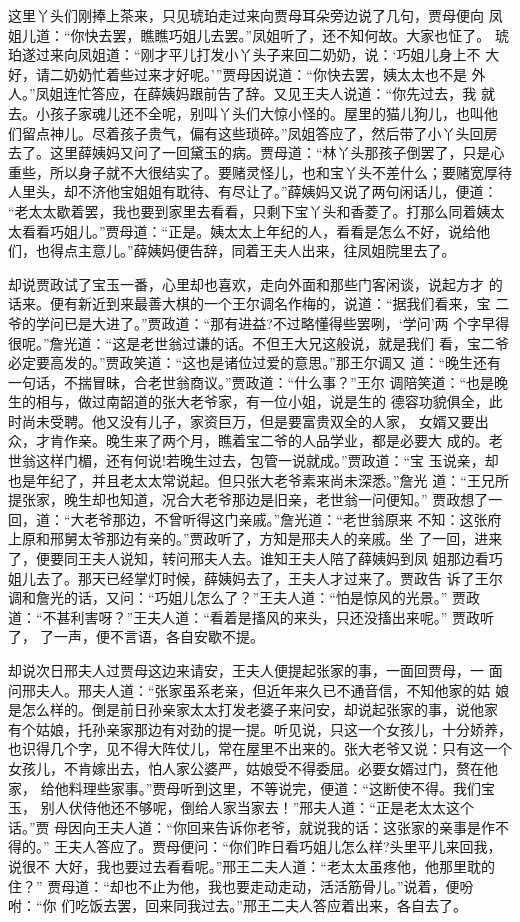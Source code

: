 这里丫头们刚捧上茶来，只见琥珀走过来向贾母耳朵旁边说了几句，贾母便向
凤姐儿道：“你快去罢，瞧瞧巧姐儿去罢。”凤姐听了，还不知何故。大家也怔了。
琥珀遂过来向凤姐道：“刚才平儿打发小丫头子来回二奶奶，说：‘巧姐儿身上不
大好，请二奶奶忙着些过来才好呢。’”贾母因说道：“你快去罢，姨太太也不是
外人。”凤姐连忙答应，在薛姨妈跟前告了辞。又见王夫人说道：“你先过去，我
就去。小孩子家魂儿还不全呢，别叫丫头们大惊小怪的。屋里的猫儿狗儿，也叫他
们留点神儿。尽着孩子贵气，偏有这些琐碎。”凤姐答应了，然后带了小丫头回房
去了。这里薛姨妈又问了一回黛玉的病。贾母道：“林丫头那孩子倒罢了，只是心
重些，所以身子就不大很结实了。要赌灵怪儿，也和宝丫头不差什么；要赌宽厚待
人里头，却不济他宝姐姐有耽待、有尽让了。”薛姨妈又说了两句闲话儿，便道：
“老太太歇着罢，我也要到家里去看看，只剩下宝丫头和香菱了。打那么同着姨太
太看看巧姐儿。”贾母道：“正是。姨太太上年纪的人，看看是怎么不好，说给他
们，也得点主意儿。”薛姨妈便告辞，同着王夫人出来，往凤姐院里去了。

却说贾政试了宝玉一番，心里却也喜欢，走向外面和那些门客闲谈，说起方才
的话来。便有新近到来最善大棋的一个王尔调名作梅的，说道：“据我们看来，宝
二爷的学问已是大进了。”贾政道：“那有进益?不过略懂得些罢咧，‘学问’两
个字早得很呢。”詹光道：“这是老世翁过谦的话。不但王大兄这般说，就是我们
看，宝二爷必定要高发的。”贾政笑道：“这也是诸位过爱的意思。”那王尔调又
道：“晚生还有一句话，不揣冒昧，合老世翁商议。”贾政道：“什么事？”王尔
调陪笑道：“也是晚生的相与，做过南韶道的张大老爷家，有一位小姐，说是生的
德容功貌俱全，此时尚未受聘。他又没有儿子，家资巨万，但是要富贵双全的人家，
女婿又要出众，才肯作亲。晚生来了两个月，瞧着宝二爷的人品学业，都是必要大
成的。老世翁这样门楣，还有何说!若晚生过去，包管一说就成。”贾政道：“宝
玉说亲，却也是年纪了，并且老太太常说起。但只张大老爷素来尚未深悉。”詹光
道：“王兄所提张家，晚生却也知道，况合大老爷那边是旧亲，老世翁一问便知。”
贾政想了一回，道：“大老爷那边，不曾听得这门亲戚。”詹光道：“老世翁原来
不知：这张府上原和邢舅太爷那边有亲的。”贾政听了，方知是邢夫人的亲戚。坐
了一回，进来了，便要同王夫人说知，转问邢夫人去。谁知王夫人陪了薛姨妈到凤
姐那边看巧姐儿去了。那天已经掌灯时候，薛姨妈去了，王夫人才过来了。贾政告
诉了王尔调和詹光的话，又问：“巧姐儿怎么了？”王夫人道：“怕是惊风的光景。”
贾政道：“不甚利害呀？”王夫人道：“看着是搐风的来头，只还没搐出来呢。”
贾政听了，了一声，便不言语，各自安歇不提。

却说次日邢夫人过贾母这边来请安，王夫人便提起张家的事，一面回贾母，一
面问邢夫人。邢夫人道：“张家虽系老亲，但近年来久已不通音信，不知他家的姑
娘是怎么样的。倒是前日孙亲家太太打发老婆子来问安，却说起张家的事，说他家
有个姑娘，托孙亲家那边有对劲的提一提。听见说，只这一个女孩儿，十分娇养，
也识得几个字，见不得大阵仗儿，常在屋里不出来的。张大老爷又说：只有这一个
女孩儿，不肯嫁出去，怕人家公婆严，姑娘受不得委屈。必要女婿过门，赘在他家，
给他料理些家事。”贾母听到这里，不等说完，便道：“这断使不得。我们宝玉，
别人伏侍他还不够呢，倒给人家当家去！”邢夫人道：“正是老太太这个话。”贾
母因向王夫人道：“你回来告诉你老爷，就说我的话：这张家的亲事是作不得的。”
王夫人答应了。贾母便问：“你们昨日看巧姐儿怎么样?头里平儿来回我，说很不
大好，我也要过去看看呢。”邢王二夫人道：“老太太虽疼他，他那里耽的住？”
贾母道：“却也不止为他，我也要走动走动，活活筋骨儿。”说着，便吩咐：“你
们吃饭去罢，回来同我过去。”邢王二夫人答应着出来，各自去了。

